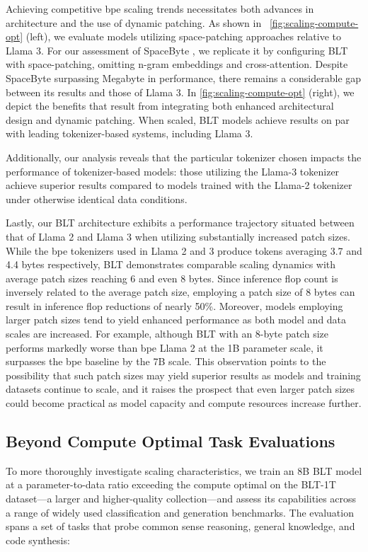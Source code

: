 Achieving competitive bpe scaling trends necessitates both advances in architecture and the use of dynamic patching. As shown in ~\autoref{fig:scaling-compute-opt} (left), we evaluate models utilizing space-patching approaches relative to Llama 3. For our assessment of SpaceByte \citep{slagle2024spacebyte}, we replicate it by configuring {\textsc BLT} with space-patching, omitting n-gram embeddings and cross-attention. Despite SpaceByte surpassing Megabyte in performance, there remains a considerable gap between its results and those of Llama 3. In \autoref{fig:scaling-compute-opt} (right), we depict the benefits that result from integrating both enhanced architectural design and dynamic patching. When scaled, {\textsc BLT} models achieve results on par with leading tokenizer-based systems, including Llama 3.

Additionally, our analysis reveals that the particular tokenizer chosen impacts the performance of tokenizer-based models: those utilizing the Llama-3 tokenizer achieve superior results compared to models trained with the Llama-2 tokenizer under otherwise identical data conditions.

Lastly, our {\textsc BLT} architecture exhibits a performance trajectory situated between that of Llama 2 and Llama 3 when utilizing substantially increased patch sizes. While the bpe tokenizers used in Llama 2 and 3 produce tokens averaging 3.7 and 4.4 bytes respectively, {\textsc BLT} demonstrates comparable scaling dynamics with average patch sizes reaching 6 and even 8 bytes. Since inference flop count is inversely related to the average patch size, employing a patch size of 8 bytes can result in inference flop reductions of nearly 50\%. Moreover, models employing larger patch sizes tend to yield enhanced performance as both model and data scales are increased. For example, although {\textsc BLT} with an 8-byte patch size performs markedly worse than bpe Llama 2 at the 1B parameter scale, it surpasses the bpe baseline by the 7B scale. This observation points to the possibility that such patch sizes may yield superior results as models and training datasets continue to scale, and it raises the prospect that even larger patch sizes could become practical as model capacity and compute resources increase further.

\subsection{Beyond Compute Optimal Task Evaluations}
\label{section:evals}
To more thoroughly investigate scaling characteristics, we train an 8B {\textsc BLT} model at a parameter-to-data ratio exceeding the compute optimal on the {\textsc BLT}-1T dataset—a larger and higher-quality collection—and assess its capabilities across a range of widely used classification and generation benchmarks. The evaluation spans a set of tasks that probe common sense reasoning, general knowledge, and code synthesis:
